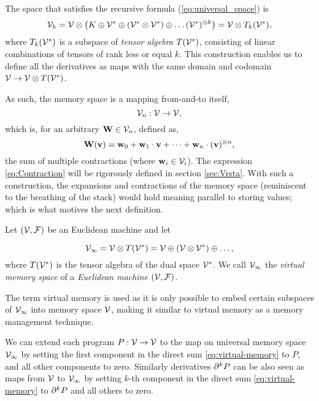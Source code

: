   The space that satisfies the recursive formula (\ref{eq:universal_space}) is
  \begin{equation}
    \label{eq:k-th-virtual-space}
    \mathcal{V}_k = \mathcal{V}\otimes \left(K\oplus \mathcal{V}^* \oplus (\mathcal{V}^*\otimes \mathcal{V}^*)\oplus\ldots
      (\mathcal{V}^*)^{\otimes k}\right) = \mathcal{V}\otimes T_k(\mathcal{V}^*),
  \end{equation}
  where $T_k(\mathcal{V}^*)$ is a subspace of \emph{tensor algebra} $T(\mathcal{V}^*)$, consisting of
  linear combinations of tensors of rank less or equal $k$. This construction
  enables us to define all the derivatives as maps with 
  the same domain and codomain $\mathcal{V}\to \mathcal{V}\otimes T(\mathcal{V}^*)$.

  As such, the memory space is a mapping from-and-to itself,
\begin{equation}
\mathcal{V}_n:\mathcal{V}\to\mathcal{V},
\end{equation}
which is, for an arbitrary $\mathbf{W}\in\mathcal{V}_n$, defined as, 
\begin{equation}
\mathbf{W}(\mathbf{v})=\mathbf{w}_0+\mathbf{w}_1\cdot\mathbf{v}+\cdots+\mathbf{w}_n\cdot(\mathbf{v})^{\otimes n}\label{eq:Contraction},
\end{equation}
the sum of multiple contractions (where $\mathbf{w}_i\in\mathcal{V}_i$). The expression \eqref{eq:Contraction} will be rigorously defined in section \ref{sec:Vrsta}. With such a construction, the expansions and contractions of the memory space (reminiscent to the breathing of the stack) would hold meaning parallel to storing values; which is what motives the next definition.

\begin{definition}\label{def:VV}
Let $(\mathcal{V},\mathcal{F})$ be an Euclidean machine and let  

\begin{equation}
\mathcal{V}_\infty = \mathcal{V}\otimes T(\mathcal{V}^*) = \mathcal{V}\oplus
(\mathcal{V}\otimes\mathcal{V}^*)\oplus\ldots,\label{eq:virtual-memory}
\end{equation}
where $T(\mathcal{V}^*)$ is the tensor algebra of the dual space $\mathcal{V}^*$.
We call $\mathcal{V}_\infty$ the \emph{virtual memory space} of a \emph{Euclidean machine} $(\mathcal{V},\mathcal{F})$.
\end{definition}
The term virtual memory is used as it is only possible to embed certain subspaces of $\mathcal{V}_\infty$ into memory space $\mathcal{V}$, making it similar to
virtual memory as a memory management technique. 

We can extend each program $P:\mathcal{V}\to \mathcal{V}$ to the map on
universal memory space $\mathcal{V}_\infty$ by setting the first component in the direct sum
\eqref{eq:virtual-memory} to $P$, and all other components to zero. Similarly
derivatives $\partial^k P$ can be also seen as maps  from $\mathcal{V}$ to $\mathcal{V}_\infty$ by
setting $k$-th component in the direct sum \eqref{eq:virtual-memory} to $\partial^k P$
and all others to zero.

